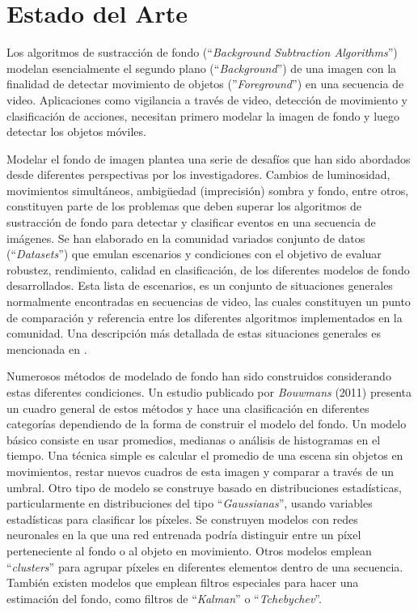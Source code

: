 \chapter{Estado del Arte}


\indent Los algoritmos de sustracción de fondo (``\textit{Background Subtraction Algorithms}'') modelan esencialmente el segundo plano (``\textit{Background}'') de una imagen con la finalidad de detectar movimiento de objetos (''\textit{Foreground}'') en una secuencia de video. Aplicaciones como vigilancia a través de video, detección de movimiento y clasificación de acciones, necesitan primero modelar la imagen de fondo y luego detectar los objetos móviles.

\indent Modelar el fondo de imagen plantea una serie de desafíos que han sido abordados desde diferentes perspectivas por los investigadores. Cambios de luminosidad, movimientos simultáneos, ambigüedad (imprecisión) sombra y fondo, entre otros, constituyen parte de los problemas que deben superar los algoritmos de sustracción de fondo para detectar y clasificar eventos en una secuencia de imágenes. Se han elaborado en la comunidad variados conjunto de datos (``\textit{Datasets}'') \cite{singh_muhavi_2010, weinland_free_2006, schuldt_recognizing_2004, gross_cmu_2001, gorelick_actions_2007} que emulan escenarios y condiciones con el objetivo de evaluar robustez, rendimiento, calidad en clasificación, de los diferentes modelos de fondo desarrollados. Esta lista de escenarios, es un conjunto de situaciones generales normalmente encontradas en secuencias de video, las cuales constituyen un punto de comparación y referencia entre los diferentes algoritmos implementados en la comunidad. Una descripción más detallada de estas situaciones generales es mencionada en \cite{toyama_wallflower_1999}.

\indent Numerosos métodos de modelado de fondo han sido construidos considerando estas diferentes condiciones. Un estudio publicado por \textit{Bouwmans}\cite{bouwmans_recent_2011} (2011)  presenta un cuadro general de estos métodos y hace una clasificación en diferentes categorías dependiendo de la forma de construir el modelo del fondo. Un modelo básico consiste en usar promedios, medianas o análisis de histogramas en el tiempo. Una técnica simple es calcular el promedio de una escena sin objetos en movimientos, restar nuevos cuadros de esta imagen y comparar a través de un umbral. Otro tipo de modelo se construye basado en distribuciones estadísticas, particularmente en distribuciones del tipo ``\textit{Gaussianas}'', usando variables estadísticas para clasificar los píxeles. Se construyen modelos con redes neuronales en la que una red entrenada podría distinguir entre un píxel perteneciente al fondo o al objeto en movimiento. Otros modelos emplean ``\textit{clusters}'' para agrupar píxeles en diferentes elementos dentro de una secuencia. También existen modelos que emplean filtros especiales para hacer una estimación del fondo, como filtros de ``\textit{Kalman}'' o ``\textit{Tchebychev}''.  

